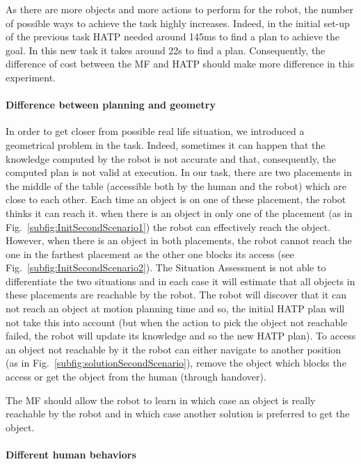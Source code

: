 \documentclass[english,a4paper,11pt,twoside]{StyleThese}
\begin{document}
As there are more objects and more actions to perform for the robot, the number of possible ways to achieve the task highly increases. Indeed, in the initial set-up of the previous task HATP needed around 145ms to find a plan to achieve the goal. In this new task it takes around 22s to find a plan. Consequently, the difference of cost between the MF and HATP should make more difference in this experiment.

\paragraph{Difference between planning and geometry}

In order to get closer from possible real life situation, we introduced a geometrical problem in the task. Indeed, sometimes it can happen that the knowledge computed by the robot is not accurate and that, consequently, the computed plan is not valid at execution. In our task, there are two placements in the middle of the table (accessible both by the human and the robot) which are close to each other. Each time an object is on one of these placement, the robot thinks it can reach it. when there is an object in only one of the placement (as in Fig.~\ref{subfig:InitSecondScenario1}) the robot can effectively reach the object. However, when there is an object in both placements, the robot cannot reach the one in the farthest placement as the other one blocks its access (see Fig.~\ref{subfig:InitSecondScenario2}). The Situation Assessment is not able to differentiate the two situations and in each case it will estimate that all objects in these placements are reachable by the robot. The robot will discover that it can not reach an object at motion planning time and so, the initial HATP plan will not take this into account (but when the action to pick the object not reachable failed, the robot will update its knowledge and so the new HATP plan). To access an object not reachable by it the robot can either navigate to another position (as in Fig.~\ref{subfig:solutionSecondScenario}), remove the object which blocks the access or get the object from the human (through handover).

The MF should allow the robot to learn in which case an object is really reachable by the robot and in which case another solution is preferred to get the object.

\paragraph{Different human behaviors}
\end{document}
